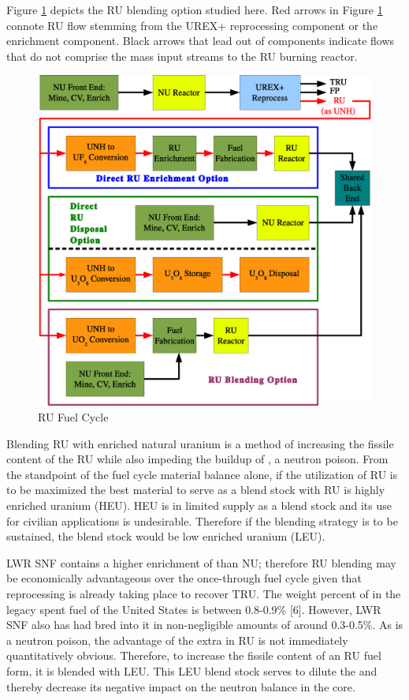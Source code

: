 Figure \ref{1g_fig08} depicts the RU blending option studied here.  Red arrows in Figure \ref{1g_fig08} 
connote RU flow stemming from the UREX+ reprocessing component or the enrichment component.  Black arrows 
that lead out of components indicate flows that do not comprise the mass input streams to the RU burning reactor.  
\begin{figure}[htbp]
\caption{RU Fuel Cycle}
\label{1g_fig08}
\begin{center}
\includegraphics[scale=0.5]{one_group_method/figs/Fig08.eps}
\end{center}
\end{figure}
Blending RU with enriched natural uranium is a method of increasing the fissile content of the RU while 
also impeding the buildup of , a neutron poison.  From the standpoint of the fuel cycle material 
balance alone, if the utilization of RU is to be maximized the best material to serve as a blend stock with 
RU is highly enriched uranium (HEU).  HEU is in limited supply as a blend stock and its use for civilian 
applications is undesirable.  Therefore if the blending strategy is to be sustained, the blend stock would be low 
enriched uranium (LEU).  

LWR SNF contains a higher enrichment of  than NU; therefore RU blending may be economically 
advantageous over the once-through fuel cycle given that reprocessing is already taking place to recover 
TRU. The weight percent of  in the legacy spent fuel of the United States is between 0.8-0.9\% [6].  
However, LWR SNF also has had  bred into it in non-negligible amounts of around 0.3-0.5\%.  
As  is a neutron poison, the advantage of the extra  in RU is not immediately 
quantitatively obvious.  Therefore, to increase the fissile content of an RU fuel form, it is blended 
with LEU. This LEU blend stock serves to dilute the  and thereby decrease its negative 
impact on the neutron balance in the core. 

